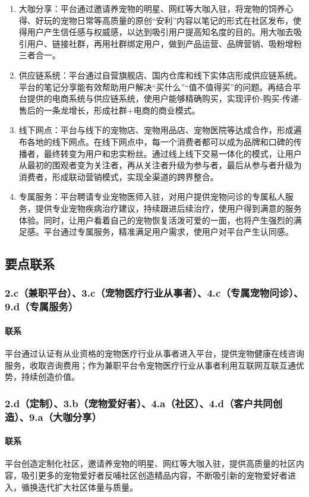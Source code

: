 \documentclass[a4paper]{ctexart}
\begin{document}
\begin{enumerate}[label=\alph*.]
  \item 大咖分享：平台通过邀请养宠物的明星、网红等大咖入驻，将宠物的饲养心得、好玩的宠物日常等高质量的原创“安利”内容以笔记的形式在社区发布，使得用户产生信任感与权威感，以达到吸引用户提高知名度的目的。用大咖去吸引用户、链接社群，再用社群绑定用户，做到产品运营、品牌营销、吸粉增粉三者合一。
  \item 供应链系统：平台通过自营旗舰店、国内仓库和线下实体店形成供应链系统。平台的笔记分享能有效帮助用户解决“买什么”“值不值得买”的问题。再结合平台提供的电商系统与供应链系统，使用户能够精确购买，实现评价-购买-传递-售后的一条龙增长，形成社群+电商的商业模式。
  \item 线下网点：平台与线下的宠物店、宠物用品店、宠物医院等达成合作，形成遍布各地的线下网点。在线下网点中，每一个消费者都可以成为品牌和口碑的传播者，最终转变为用户和忠实粉丝。通过线上线下交易一体化的模式，让用户从最初的围观者变为关注者，再从关注者升级为参与者，最后从参与者升级为消费者，形成联动营销模式，实现全渠道的跨界整合。
  \item 专属服务：平台聘请专业宠物医师入驻，对用户提供宠物问诊的专属私人服务，提供专业宠物疾病治疗建议，持续跟进后续治疗，使用户得到满意的服务体验。同时，让用户看着自己的宠物恢复活泼可爱的一面，也将产生强烈的满足感。平台通过专属服务，精准满足用户需求，使用户对平台产生认同感。
\end{enumerate}


\subsection{要点联系}
\subsubsection{2.c（兼职平台）、3.c（宠物医疗行业从事者）、4.c（专属宠物问诊）、9.d（专属服务）}
\paragraph{联系}平台通过认证有从业资格的宠物医疗行业从事者进入平台，提供宠物健康在线咨询服务，收取咨询费用；作为兼职平台令宠物医疗行业从事者利用互联网互联互通优势，持续创造价值。
\subsubsection{2.d（定制）、3.b（宠物爱好者）、4.a（社区）、4.d（客户共同创造）、9.a（大咖分享）}
\paragraph{联系}平台创造定制化社区，邀请养宠物的明星、网红等大咖入驻，提供高质量的社区内容，吸引更多的宠物爱好者反哺社区创造精品内容，不断吸引新的宠物爱好者进入，循换迭代扩大社区体量与质量。
\end{document}

